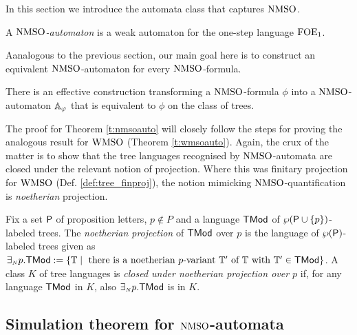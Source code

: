 
In this section we introduce the automata class that captures $\mathrm{NMSO}$. 

\begin{definition}
A \emph{$\mathrm{NMSO}$-automaton} is a weak automaton for the one-step language $\mathrm{FOE}_1$.
\end{definition}

Aanalogous to the previous section, our main goal here is to construct an 
equivalent $\mathrm{NMSO}$-automaton for every $\mathrm{NMSO}$-formula.

\begin{theorem}
\label{t:nmsoauto}
There is an effective construction transforming a $\mathrm{NMSO}$-formula $\phi$
into a $\mathrm{NMSO}$-automaton $\mathbb{A}_{\varphi}$ that is equivalent
to $\phi$ on the class of trees.
\end{theorem}

The proof for Theorem \ref{t:nmsoauto} will closely follow the steps for proving 
the analogous result for $\mathrm{WMSO}$ (Theorem \ref{t:wmsoauto}).
Again, the crux of the matter is to show that the tree languages recognised by
$\mathrm{NMSO}$-automata are closed under the relevant notion of projection. 
Where this was finitary projection for $\mathrm{WMSO}$ (Def. \ref{def:tree_finproj}), 
the notion mimicking $\mathrm{NMSO}$-quantification is \emph{noetherian} projection.

\begin{definition}\label{def:tree_finproj}
Fix a set $\mathsf{P}$ of proposition letters, $p \not\in P$ and a language $\mathsf{TMod}$ 
of $\wp (\mathsf{P}\cup\{p\})$-labeled trees.
The \emph{noetherian projection} of $\mathsf{TMod}$ over $p$ is the language of $\wp 
(\mathsf{P})$-labeled trees given as $\noetexists p.\trees \df \{\bbT \mid \text{
there is a noetherian $p$-variant } \bbT' \text{ of } \bbT \text{ with } \bbT'
\in \trees\}$. 
A class $K$ of tree languages is \emph{closed under noetherian projection over 
$p$} if, for any language $\mathsf{TMod}$ in $K$, also ${\exists_{{\scriptscriptstyle N}} p}.\mathsf{TMod}$ is in 
$K$.
\end{definition} 

\subsection{Simulation theorem for $\mathrm{NMSO}$-automata}\label{sec:simulation_nmso}


